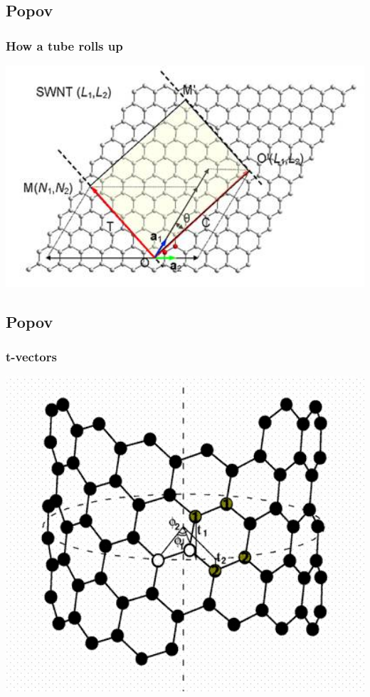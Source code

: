 \documentclass{beamer}
\begin{document}
\subsection{Popov}
\frame
{
    \frametitle{How a tube rolls up}

    \begin{center}
    \includegraphics[width=1\textwidth]{grid.jpg}
    \end{center}
}

\subsection{Popov}
\frame
{
    \frametitle{t-vectors}

    \begin{center}
    \includegraphics[width=1\textwidth]{tvectors.jpg}
    \end{center}
}
\end{document}
